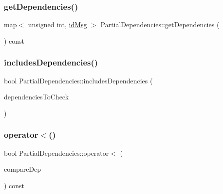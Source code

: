 \mbox{\label{classPartialDependencies_a816f0a770b1d6f3255a1485705e262d2}} 
\subsubsection{\texorpdfstring{get\+Dependencies()}{getDependencies()}}
{\footnotesize\ttfamily map$<$ unsigned int, \hyperlink{structures_8h_a83a1d9a070efa5341da84cfd8e28d3e5}{id\+Msg} $>$ Partial\+Dependencies\+::get\+Dependencies (\begin{DoxyParamCaption}{ }\end{DoxyParamCaption}) const}

\mbox{\label{classPartialDependencies_a4cfd27959669b5b7b58ea07d38824d7b}} 
\subsubsection{\texorpdfstring{includes\+Dependencies()}{includesDependencies()}}
{\footnotesize\ttfamily bool Partial\+Dependencies\+::includes\+Dependencies (\begin{DoxyParamCaption}\item[{const \hyperlink{classPartialDependencies}{Partial\+Dependencies} \&}]{dependencies\+To\+Check }\end{DoxyParamCaption})}

\mbox{\label{classPartialDependencies_af8f87bc4a622db0f56276502c6655f38}} 
\subsubsection{\texorpdfstring{operator$<$()}{operator<()}}
{\footnotesize\ttfamily bool Partial\+Dependencies\+::operator$<$ (\begin{DoxyParamCaption}\item[{const \hyperlink{classPartialDependencies}{Partial\+Dependencies} \&}]{compare\+Dep }\end{DoxyParamCaption}) const}

